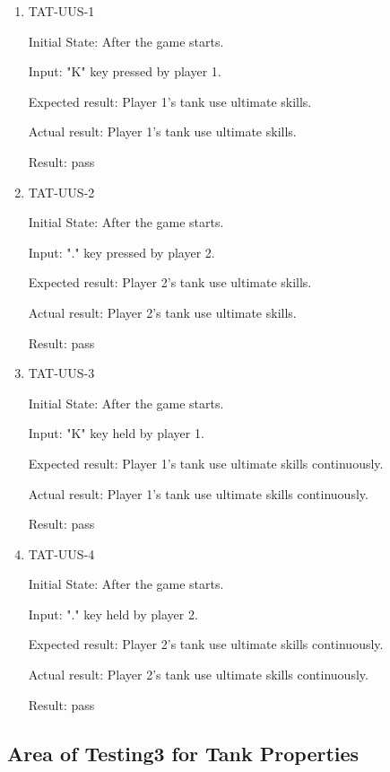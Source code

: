 \documentclass[12pt, titlepage]{article}
\begin{document}
\begin{enumerate}

\item{TAT-UUS-1\\}
					
Initial State: After the game starts.
					
Input: "K" key pressed by player 1.
					
Expected result: Player 1's tank use ultimate skills.
					
Actual result: Player 1's tank use ultimate skills.

Result: pass

\item{TAT-UUS-2\\}
					
Initial State: After the game starts.
					
Input: "." key pressed by player 2.
					
Expected result: Player 2's tank use ultimate skills.
					
Actual result: Player 2's tank use ultimate skills.

Result: pass

\item{TAT-UUS-3\\}
					
Initial State: After the game starts.
					
Input: "K" key held by player 1.
					
Expected result: Player 1's tank use ultimate skills continuously.
					
Actual result: Player 1's tank use ultimate skills continuously.

Result: pass

\item{TAT-UUS-4\\}
					
Initial State: After the game starts.
					
Input: "." key held by player 2.
					
Expected result: Player 2's tank use ultimate skills continuously.
					
Actual result: Player 2's tank use ultimate skills continuously.

Result: pass

\end{enumerate}

\subsection{Area of Testing3 for Tank Properties}
\end{document}
